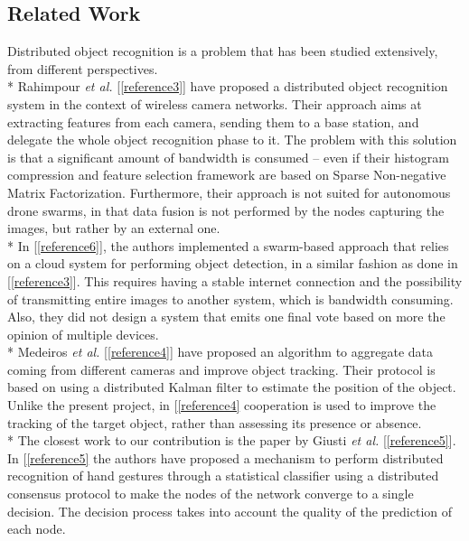 \documentclass[10pt,conference,compsocconf]{IEEEtran}
\begin{document}
\subsection{Related Work}
Distributed object recognition is a problem that has been studied extensively, from different perspectives.\\*
Rahimpour \textit{et al.} [\ref{reference3}] have proposed a distributed object recognition system in the context of wireless camera networks. Their approach aims at extracting features from each camera, sending them to a base station, and delegate the whole object recognition phase to it. The problem with this solution is that a significant amount of bandwidth is consumed -- even if their histogram compression and feature selection framework are based on Sparse Non-negative Matrix Factorization. Furthermore, their approach is not suited for autonomous drone swarms, in that data fusion is not performed by the nodes capturing the images, but rather by an external one.\\*
In [\ref{reference6}], the authors implemented a swarm-based approach that relies on a cloud system for performing object detection, in a similar fashion as done in [\ref{reference3}]. This requires having a stable internet connection and the possibility of transmitting entire images to another system, which is bandwidth consuming. Also, they did not design a system that emits one final vote based on more the opinion of multiple devices.\\*
Medeiros \textit{et al.} [\ref{reference4}] have proposed an algorithm to aggregate data coming from different cameras and improve object tracking. Their protocol is based on using a distributed Kalman filter  to estimate the position of the object. Unlike the present project, in [\ref{reference4} cooperation is used to improve the tracking of the target object, rather than assessing its presence or absence.\\*
The closest work to our contribution is the paper by Giusti \textit{et al.} [\ref{reference5}]. In [\ref{reference5} the authors have proposed a mechanism to perform distributed recognition of hand gestures through a statistical classifier using a distributed consensus protocol to make the nodes of the network converge to a single decision. The decision process takes into account the quality of the prediction of each node.
\end{document}
